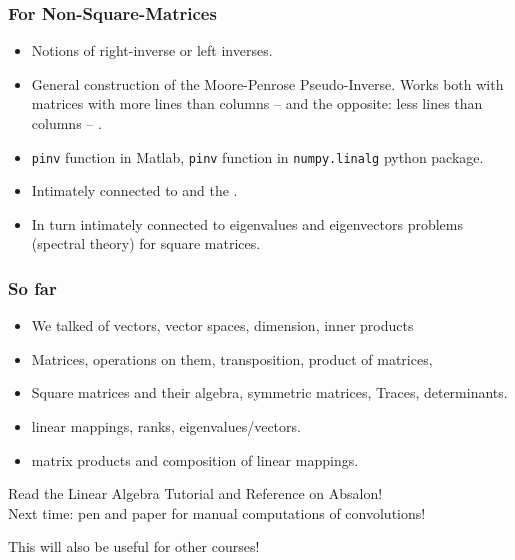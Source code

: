 \documentclass[8pt,dvipsnames]{beamer}
\newcommand{\myemph}[1]{{\color{blue}{#1}}}
\begin{document}
\begin{frame}
  \frametitle{For Non-Square-Matrices}
  \begin{itemize}
  \item Notions of right-inverse or left inverses.
  \item General construction of the Moore-Penrose
    Pseudo-Inverse. Works both with matrices with more lines than
    columns -- \myemph{overdetermined linear systems} and the
    opposite: less lines than columns -- \myemph{underdetermined
      linear systems}.
  \item \texttt{pinv} function in Matlab, \texttt{pinv} function in \texttt{numpy.linalg} python package.
  \item Intimately connected to \myemph{linear least-squares problems} and the \myemph{Singular Value Decomposition}.
  \item In turn intimately connected to eigenvalues and eigenvectors problems (spectral theory) for square matrices.
  \end{itemize}
\end{frame}






\begin{frame}
  \frametitle{So far}
  \begin{itemize}
  \item We talked of vectors, vector spaces, dimension, inner products
  \item Matrices, operations on them, transposition, product of matrices,
    \item Square matrices and their algebra, symmetric matrices, Traces, determinants.
    \item linear mappings, ranks, eigenvalues/vectors.
    \item matrix products and composition of linear mappings.
  \end{itemize}
\vfill
  \begin{center}
    \large
    Read the Linear Algebra Tutorial and Reference on Absalon!\\
    Next time: pen and paper for manual computations of convolutions!
  \end{center}
  This will also be useful for other courses!
\end{frame}
\end{document}
